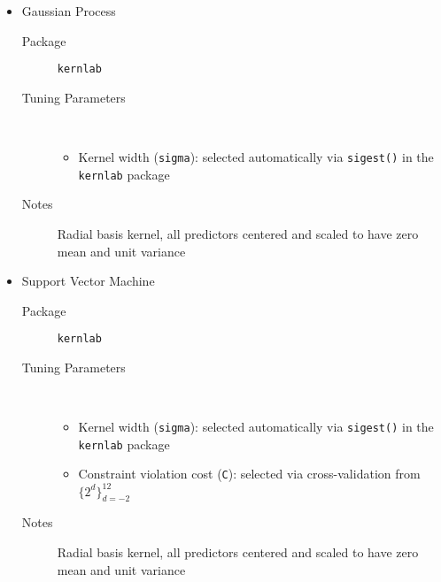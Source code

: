 \begin{itemize}
  \item Gaussian Process
  \begin{description}
    \item[Package] \texttt{kernlab} \citep{pkg-kernlab}
    \item[Tuning Parameters] ~
    \begin{itemize}
      \item Kernel width (\texttt{sigma}): selected automatically via \texttt{sigest()} in the \texttt{kernlab} package
    \end{itemize}
    \item[Notes] Radial basis kernel, all predictors centered and scaled to have zero mean and unit variance
  \end{description}

  \item Support Vector Machine
  \begin{description}
    \item[Package] \texttt{kernlab} \citep{pkg-kernlab}
    \item[Tuning Parameters] ~
    \begin{itemize}
      \item Kernel width (\texttt{sigma}): selected automatically via \texttt{sigest()} in the \texttt{kernlab} package
      \item Constraint violation cost (\texttt{C}): selected via cross-validation from $\{2^d\}_{d=-2}^{12}$
    \end{itemize}
    \item[Notes] Radial basis kernel, all predictors centered and scaled to have zero mean and unit variance
  \end{description}
\end{itemize}

